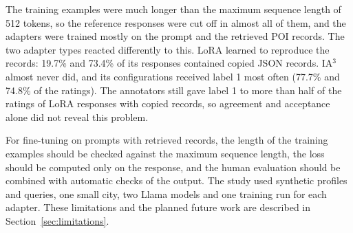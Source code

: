 \documentclass[journal,article,submit,pdftex,moreauthors]{Definitions/mdpi}
\begin{document}
The training examples were much longer than the maximum sequence length of 512 tokens, so the reference responses were cut off in almost all of them, and the adapters were trained mostly on the prompt and the retrieved POI records. The two adapter types reacted differently to this. LoRA learned to reproduce the records: 19.7\% and 73.4\% of its responses contained copied JSON records. IA$^3$ almost never did, and its configurations received label 1 most often (77.7\% and 74.8\% of the ratings). The annotators still gave label 1 to more than half of the ratings of LoRA responses with copied records, so agreement and acceptance alone did not reveal this problem.

For fine-tuning on prompts with retrieved records, the length of the training examples should be checked against the maximum sequence length, the loss should be computed only on the response, and the human evaluation should be combined with automatic checks of the output. The study used synthetic profiles and queries, one small city, two Llama models and one training run for each adapter. These limitations and the planned future work are described in Section~\ref{sec:limitations}.

\vspace{6pt} 




\end{document}

